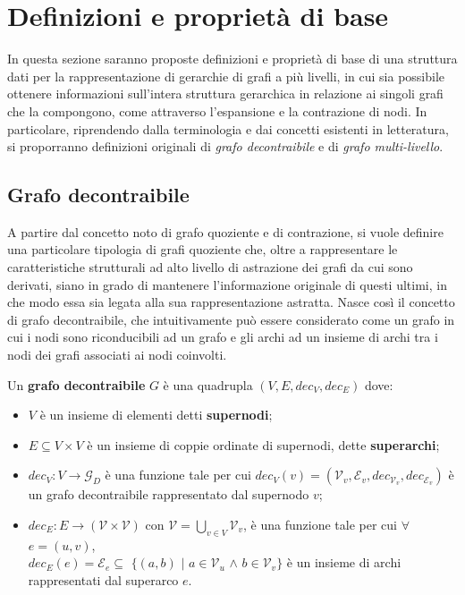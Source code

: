 \section{Definizioni e propriet\`a di base}\label{sec:definizioni-e-proprieta-di-base}

In questa sezione saranno proposte definizioni e propriet\`a di base di una struttura dati per la rappresentazione
di gerarchie di grafi a pi\`u livelli, in cui sia possibile ottenere informazioni sull'intera struttura gerarchica in
relazione ai singoli grafi che la compongono, come attraverso l'espansione e la contrazione di nodi.
In particolare, riprendendo dalla terminologia e dai concetti esistenti in letteratura, si proporranno definizioni
originali di \textit{grafo decontraibile} e di \textit{grafo multi-livello}.

\subsection{Grafo decontraibile}

A partire dal concetto noto di grafo quoziente e di contrazione, si vuole definire una particolare
tipologia di grafi quoziente che, oltre a rappresentare le caratteristiche strutturali ad alto livello di astrazione
dei grafi da cui sono derivati, siano in grado di mantenere l'informazione originale di questi ultimi, in
che modo essa sia legata alla sua rappresentazione astratta. \newline
Nasce così il concetto di grafo decontraibile, che intuitivamente pu\`o essere considerato come un grafo
in cui i nodi sono riconducibili ad un grafo e gli archi ad un insieme di archi tra i nodi dei grafi
associati ai nodi coinvolti.
\newpage

\begin{definition}
    Un \textbf{grafo decontraibile} $G$ \`e una quadrupla $(V, E, dec_V, dec_E)$ dove:
    \begin{itemize}
        \item $V$ \`e un insieme di elementi detti \textbf{supernodi};
        \item $E \subseteq V \times V$ \`e un insieme di coppie ordinate di supernodi, dette \textbf{superarchi};
        \item $dec_V : V \rightarrow \mathcal{G}_D$ \`e una funzione tale per cui $dec_V(v) = (\mathcal{V}_v,
            \mathcal{E}_v, dec_{\mathcal{V}_v}, dec_{\mathcal{E}_v})$ \`e un grafo decontraibile rappresentato
            dal supernodo $v$;
        \item $dec_E : E \rightarrow (\mathcal{V} \times \mathcal{V})$ con $\mathcal{V} = \bigcup_{v \in V}\mathcal{V}_v$,
            \`e una funzione tale per cui $\forall$ $ e = (u, v)$, \\ $dec_E(e) = \mathcal{E}_e \subseteq$ $\{(a, b)$ $\mid$ $a \in \mathcal{V}_u$ $\wedge$
            $b \in \mathcal{V}_v\}$ \`e un insieme di archi rappresentati dal superarco $e$.
    \end{itemize}
\end{definition}

